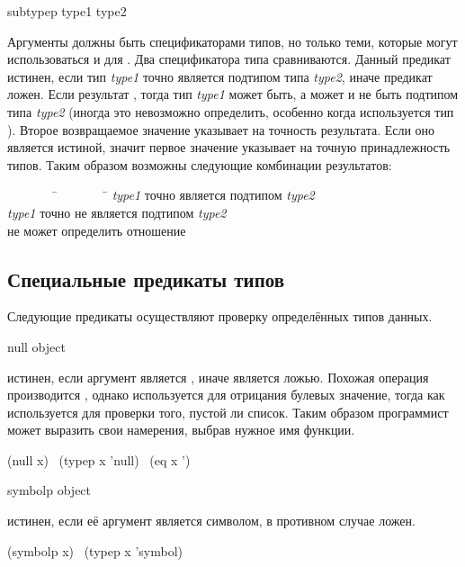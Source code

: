\begin{defun}[Функция]
subtypep type1 type2

Аргументы должны быть спецификаторами типов, но только теми, которые могут
использоваться и для .
Два спецификатора типа сравниваются. Данный предикат истинен, если
тип \emph{type1} точно является подтипом типа \emph{type2}, иначе предикат ложен.
Если результат {\false}, тогда тип \emph{type1} может быть, а может и не быть
подтипом типа \emph{type2} (иногда это невозможно определить, особенно когда
используется тип ).
Второе возвращаемое значение указывает на точность результата. Если оно является
истиной, значит первое значение указывает на точную принадлежность типов. Таким
образом возможны следующие комбинации результатов:
\begin{tabbing}
~~~~~~~~\=~~~~~~~~\=\kill
{\true}\>{\true}\>\emph{type1} точно является подтипом \emph{type2} \\
{\false}\>{\true}\>\emph{type1} точно не является подтипом \emph{type2} \\
{\false}\>{\false}\> не может определить отношение
\end{tabbing}
\end{defun}

\subsection{Специальные предикаты типов}

Следующие предикаты осуществляют проверку определённых типов данных.

\begin{defun}[Функция]
null object

 истинен, если аргумент является {\emptylist}, иначе является
ложью. Похожая операция производится , однако  используется для
отрицания булевых значение, тогда как  используется для проверки
того, пустой ли список. Таким образом программист может выразить свои намерения, 
выбрав нужное имя функции.
\begin{lisp}
(null x) \EQ\ (typep x 'null) \EQ\ (eq x '{\emptylist})
\end{lisp}
\end{defun}

\begin{defun}[Функция]
symbolp object

 истинен, если её аргумент является символом, в противном
случае ложен.
\begin{lisp}
(symbolp x) \EQ\ (typep x 'symbol)
\end{lisp}
\end{defun}

